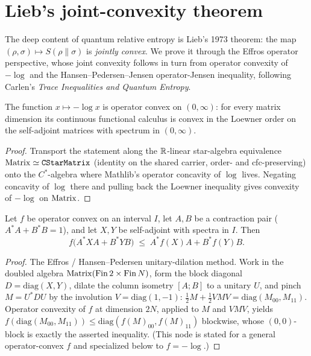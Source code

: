 \section{Lieb's joint-convexity theorem}

The deep content of quantum relative entropy is Lieb's 1973 theorem: the map
\((\rho,\sigma)\mapsto S(\rho\|\sigma)\) is \emph{jointly convex}. We prove it through the Effros
operator perspective, whose joint convexity follows in turn from operator convexity of \(-\log\)
and the Hansen--Pedersen--Jensen operator-Jensen inequality, following Carlen's \emph{Trace
Inequalities and Quantum Entropy}.

\begin{theorem}\label{operatorConvexOn_neg_log}
  \leanok
  The function \(x\mapsto -\log x\) is operator convex on \((0,\infty)\): for every matrix
  dimension its continuous functional calculus is convex in the Loewner order on the self-adjoint
  matrices with spectrum in \((0,\infty)\).
\end{theorem}
\begin{proof}\leanok
  Transport the statement along the \(\mathbb{R}\)-linear star-algebra equivalence
  \(\operatorname{Matrix}\simeq\texttt{CStarMatrix}\) (identity on the shared carrier, order- and
  cfc-preserving) onto the \(C^{*}\)-algebra where Mathlib's operator concavity of \(\log\) lives.
  Negating concavity of \(\log\) there and pulling back the Loewner inequality gives convexity of
  \(-\log\) on \(\operatorname{Matrix}\).
\end{proof}

\begin{theorem}\label{hpj_affine}
  \leanok
  Let \(f\) be operator convex on an interval \(I\), let \(A,B\) be a contraction pair
  (\(A^{*}A + B^{*}B = 1\)), and let \(X,Y\) be self-adjoint with spectra in \(I\). Then
  \[
    f\bigl(A^{*}XA + B^{*}YB\bigr) \;\le\; A^{*}f(X)A + B^{*}f(Y)B.
  \]
\end{theorem}
\begin{proof}\leanok
  The Effros / Hansen--Pedersen unitary-dilation method. Work in the doubled algebra
  \(\operatorname{Matrix}(\operatorname{Fin} 2\times\operatorname{Fin} N)\), form the block diagonal \(D = \mathrm{diag}(X,Y)\), dilate the
  column isometry \([A;B]\) to a unitary \(U\), and pinch \(M = U^{*}DU\) by the involution
  \(V = \mathrm{diag}(1,-1)\): \(\tfrac12 M + \tfrac12 VMV = \mathrm{diag}(M_{00},M_{11})\).
  Operator convexity of \(f\) at dimension \(2N\), applied to \(M\) and \(VMV\), yields
  \(f(\mathrm{diag}(M_{00},M_{11}))\le\mathrm{diag}(f(M)_{00},f(M)_{11})\) blockwise, whose
  \((0,0)\)-block is exactly the asserted inequality. (This node is stated for a general
  operator-convex \(f\) and specialized below to \(f = -\log\).)
\end{proof}

